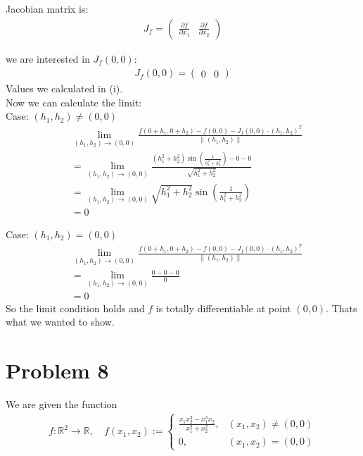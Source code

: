 \documentclass{article}
\begin{document}
Jacobian matrix is:
\begin{align*}
   J_f = \begin{pmatrix}
      \frac{\partial f}{\partial x_1} & \frac{\partial f}{\partial x_2}
   \end{pmatrix}
\end{align*}

we are interested in \(J_f(0,0)\):
\begin{align*}
   J_f(0,0) = \begin{pmatrix}
      0 & 0
   \end{pmatrix}
\end{align*}
Values we calculated in (i). \\
Now we can calculate the limit: \\
Case: \((h_1, h_2) \neq (0,0)\)
\begin{align*}
   &\lim_{(h_1, h_2) \to (0,0)} \frac{f(0 + h_1, 0 + h_2) - f(0,0) - J_f(0,0) \cdot (h_1, h_2)^T}{\|(h_1, h_2)\|} \\
   &= \lim_{(h_1, h_2) \to (0,0)} \frac{(h_1^2 + h_2^2) \sin\left(\frac{1}{h_1^2 + h_2^2}\right) - 0 - 0}{\sqrt{h_1^2 + h_2^2}} \\
   &= \lim_{(h_1, h_2) \to (0,0)} \sqrt{h_1^2 + h_2^2} \sin\left(\frac{1}{h_1^2 + h_2^2}\right) \\
   &= 0
\end{align*}

Case: \((h_1, h_2) = (0,0)\)
\begin{align*}
   &\lim_{(h_1, h_2) \to (0,0)} \frac{f(0 + h_1, 0 + h_2) - f(0,0) - J_f(0,0) \cdot (h_1, h_2)^T}{\|(h_1, h_2)\|} \\
   &= \lim_{(h_1, h_2) \to (0,0)} \frac{0 - 0 - 0}{0} \\
   &= 0
\end{align*}
So the limit condition holds and \(f\) is totally differentiable at point \((0,0)\). Thats what we wanted to show.

\section*{Problem 8}

We are given the function
\begin{align*}
   f : \mathbb{R}^2 \to \mathbb{R}, \quad f(x_1, x_2) :=
   \begin{cases}
      \frac{x_1 x_2^3 - x_1^3 x_2}{x_1^2 + x_2^2}, & (x_1, x_2) \neq (0, 0) \\
      0, & (x_1, x_2) = (0, 0)
   \end{cases}
\end{align*}
\end{document}
